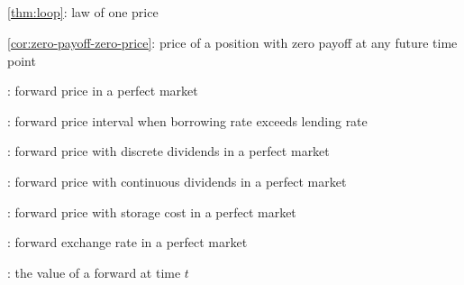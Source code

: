 \subsection*{}
\item \cref{thm:loop}: law of one price
\item \cref{cor:zero-payoff-zero-price}: price of a position with zero payoff at any
future time point
\item {}: forward price in a perfect market
\item {}: forward price interval when borrowing rate exceeds lending rate
\item {}: forward price with discrete dividends in a perfect market
\item {}: forward price with continuous dividends in a perfect market
\item {}: forward price with storage cost in a perfect market
\item {}: forward exchange rate in a perfect market
\item {}: the value of a forward at time \(t\)
